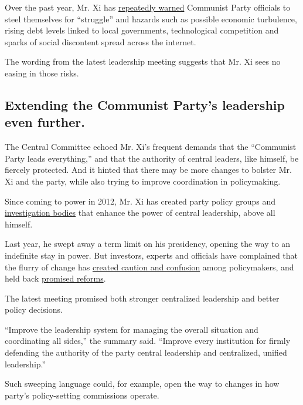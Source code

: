 Over the past year, Mr. Xi has
\href{https://www.nytimes.com/2019/02/25/world/asia/china-xi-warnings.html}{repeatedly
warned} Communist Party officials to steel themselves for ``struggle''
and hazards such as possible economic turbulence, rising debt levels
linked to local governments, technological competition and sparks of
social discontent spread across the internet.

The wording from the latest leadership meeting suggests that Mr. Xi sees
no easing in those risks.

\hypertarget{extending-the-communist-partys-leadership-even-further}{%
\subsection{Extending the Communist Party's leadership even
further.}\label{extending-the-communist-partys-leadership-even-further}}

The Central Committee echoed Mr. Xi's frequent demands that the
``Communist Party leads everything,'' and that the authority of central
leaders, like himself, be fiercely protected. And it hinted that there
may be more changes to bolster Mr. Xi and the party, while also trying
to improve coordination in policymaking.

Since coming to power in 2012, Mr. Xi has created party policy groups
and
\href{https://www.nytimes.com/2017/11/29/world/asia/china-xi-jinping-anticorruption.html}{investigation
bodies} that enhance the power of central leadership, above all himself.

Last year, he swept away a term limit on his presidency, opening the way
to an indefinite stay in power. But investors, experts and officials
have complained that the flurry of change has
\href{https://www.nytimes.com/2017/03/04/world/asia/china-xi-jinping-economic-reform.html}{created
caution and confusion} among policymakers, and held back
\href{https://www.nytimes.com/2017/03/27/business/chinese-economy-reform-critical-report.html}{promised
reforms}.

The latest meeting promised both stronger centralized leadership and
better policy decisions.

``Improve the leadership system for managing the overall situation and
coordinating all sides,'' the summary said. ``Improve every institution
for firmly defending the authority of the party central leadership and
centralized, unified leadership.''

Such sweeping language could, for example, open the way to changes in
how party's policy-setting commissions operate.

